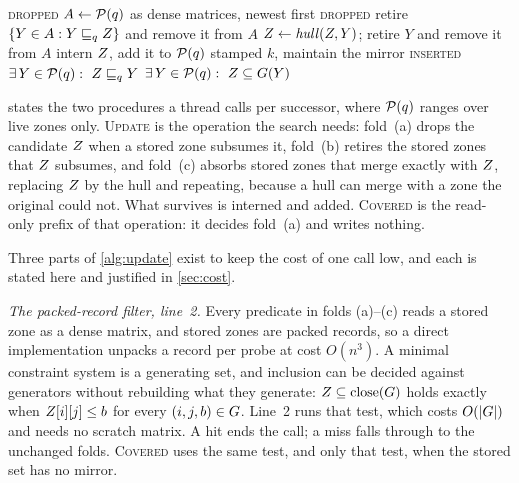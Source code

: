 \begin{algorithm}[t]
\caption{The stored-set update and the coverage probe at one discrete state}
\label{alg:update}
\begin{algorithmic}[1]
 
      \Return \textsc{dropped} 
  \EndIf
  \State $A \leftarrow \mathcal{P}(q)$ as dense matrices, newest first
   \Return \textsc{dropped}
       \EndIf
  \State retire $\{Y \in A : Y \sqsubseteq_q Z\}$ and remove it from $A$
    \State $Z \leftarrow \mathit{hull}(Z,Y)$; retire $Y$ and remove it from $A$
  \EndWhile
  \State intern $Z$, add it to $\mathcal{P}(q)$ stamped $k$, maintain the mirror
  \State \Return \textsc{inserted}
\EndProcedure
\Statex
{} 
      \Return $\exists\, Y \in \mathcal{P}(q):\ Z \sqsubseteq_q Y$ \EndIf
  \State \Return $\exists\, Y \in \mathcal{P}(q):\ Z \subseteq G(Y)$
\EndProcedure
\end{algorithmic}
\end{algorithm}

 states the two procedures a thread calls per successor, where
$\mathcal{P}(q)$ ranges over live zones only.  \textsc{Update} is the operation the
search needs: fold~(a) drops the candidate $Z$ when a stored zone subsumes
it, fold~(b) retires the stored zones that $Z$ subsumes, and fold~(c) absorbs
stored zones that merge exactly with $Z$, replacing $Z$ by the hull and
repeating, because a hull can merge with a zone the original could not.  What
survives is interned and added.  \textsc{Covered} is the read-only prefix of that
operation: it decides fold~(a) and writes nothing.

Three parts of \cref{alg:update} exist to keep the cost of one call low, and each
is stated here and justified in \cref{sec:cost}.

\emph{The packed-record filter, line~2.}  Every predicate in folds (a)--(c) reads
a stored zone as a dense matrix, and stored zones are packed records, so a direct
implementation unpacks a record per probe at cost $O(n^3)$.  A minimal constraint
system is a generating set, and inclusion can be decided against generators
without rebuilding what they generate: $Z \subseteq \mathrm{close}(G)$
holds exactly when $Z[i][j] \le b$ for every $(i,j,b) \in G$.  Line~2 runs
that test, which costs $O(|G|)$ and needs no scratch matrix.  A hit ends the
call; a miss falls through to the unchanged folds.  \textsc{Covered} uses the
same test, and only that test, when the stored set has no mirror.


